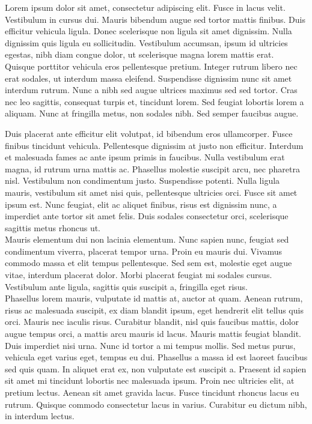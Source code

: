 Lorem ipsum dolor sit amet, consectetur adipiscing elit. Fusce in lacus velit.
Vestibulum in cursus dui. Mauris bibendum augue sed tortor mattis finibus. Duis
efficitur vehicula ligula. Donec scelerisque non ligula sit amet dignissim.
Nulla dignissim quis ligula eu sollicitudin. Vestibulum accumsan, ipsum id
ultricies egestas, nibh diam congue dolor, ut scelerisque magna lorem mattis
erat. \\

Quisque porttitor vehicula eros pellentesque pretium. Integer rutrum libero nec
erat sodales, ut interdum massa eleifend. Suspendisse dignissim nunc sit amet
interdum rutrum. Nunc a nibh sed augue ultrices maximus sed sed tortor. Cras nec
leo sagittis, consequat turpis et, tincidunt lorem. Sed feugiat lobortis lorem a
aliquam. Nunc at fringilla metus, non sodales nibh. Sed semper faucibus augue.

Duis placerat ante efficitur elit volutpat, id bibendum eros ullamcorper. Fusce
finibus tincidunt vehicula. Pellentesque dignissim at justo non efficitur.
Interdum et malesuada fames ac ante ipsum primis in faucibus. Nulla vestibulum
erat magna, id rutrum urna mattis ac. Phasellus molestie suscipit arcu, nec
pharetra nisl. Vestibulum non condimentum justo. Suspendisse potenti. Nulla
ligula mauris, vestibulum sit amet nisi quis, pellentesque ultricies orci. Fusce
sit amet ipsum est. Nunc feugiat, elit ac aliquet finibus, risus est dignissim
nunc, a imperdiet ante tortor sit amet felis. Duis sodales consectetur orci,
scelerisque sagittis metus rhoncus ut. \\

Mauris elementum dui non lacinia elementum. Nunc sapien nunc, feugiat sed
condimentum viverra, placerat tempor urna. Proin eu mauris dui. Vivamus commodo
massa et elit tempus pellentesque. Sed sem est, molestie eget augue vitae,
interdum placerat dolor. Morbi placerat feugiat mi sodales cursus. Vestibulum
ante ligula, sagittis quis suscipit a, fringilla eget risus. \\

Phasellus lorem mauris, vulputate id mattis at, auctor at quam. Aenean rutrum,
risus ac malesuada suscipit, ex diam blandit ipsum, eget hendrerit elit tellus
quis orci. Mauris nec iaculis risus. Curabitur blandit, nisl quis faucibus
mattis, dolor augue tempus orci, a mattis arcu mauris id lacus. Mauris mattis
feugiat blandit. Duis imperdiet nisi urna. Nunc id tortor a mi tempus mollis.
Sed metus purus, vehicula eget varius eget, tempus eu dui. Phasellus a massa id
est laoreet faucibus sed quis quam. In aliquet erat ex, non vulputate est
suscipit a. Praesent id sapien sit amet mi tincidunt lobortis nec malesuada
ipsum. Proin nec ultricies elit, at pretium lectus. Aenean sit amet gravida
lacus. Fusce tincidunt rhoncus lacus eu rutrum. Quisque commodo consectetur
lacus in varius. Curabitur eu dictum nibh, in interdum lectus. \\
